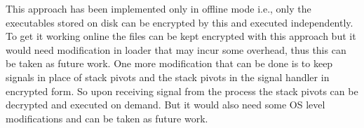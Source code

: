 \documentclass{article}
\begin{document}
\begin{multicols}{2}
	This approach has been implemented only in offline mode i.e., only the executables stored on disk can be encrypted by this and executed independently. To get it working online the files can be kept encrypted with this approach but it would need modification in loader that may incur some overhead, thus this can be taken as future work. One more modification that can be done is to keep signals in place of stack pivots and the stack pivots in the signal handler in encrypted form. So upon receiving signal from the process the stack pivots can be decrypted and executed on demand. But it would also need some OS level modifications and can be taken as future work.
	
    
    
	
	\end{multicols}
\end{document}
